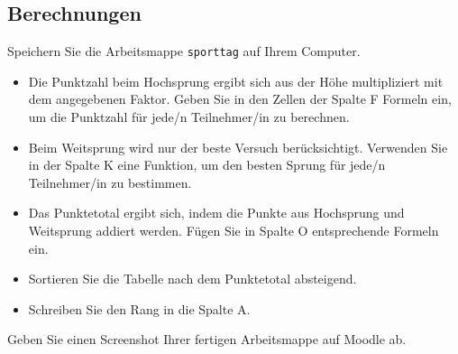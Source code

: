 \subsection{Berechnungen}
\begin{mysubmission}
    Speichern Sie die Arbeitsmappe \texttt{sporttag} auf Ihrem Computer.

    \begin{itemize}
        \item Die Punktzahl beim Hochsprung ergibt sich aus der Höhe multipliziert mit dem angegebenen Faktor. Geben Sie in den Zellen der Spalte F Formeln ein, um die Punktzahl für jede/n Teilnehmer/in zu berechnen.
        \item Beim Weitsprung wird nur der beste Versuch berücksichtigt. Verwenden Sie in der Spalte K eine Funktion, um den besten Sprung für jede/n Teilnehmer/in zu bestimmen.
        \item Das Punktetotal ergibt sich, indem die Punkte aus Hochsprung und Weitsprung addiert werden. Fügen Sie in Spalte O entsprechende Formeln ein.
        \item Sortieren Sie die Tabelle nach dem Punktetotal absteigend.
        \item Schreiben Sie den Rang in die Spalte A.
    \end{itemize}
    Geben Sie einen Screenshot Ihrer fertigen Arbeitsmappe auf Moodle ab.
\end{mysubmission}


